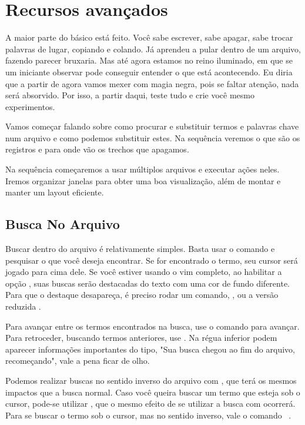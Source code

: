 \chapter{Recursos avançados}
A maior parte do básico está feito.  Você sabe escrever, sabe apagar, sabe
trocar palavras de lugar, copiando e colando.  Já aprendeu a pular dentro
de um arquivo, fazendo parecer bruxaria.  Mas até agora estamos no reino
iluminado, em que se um iniciante observar pode conseguir entender o que
está acontecendo.  Eu diria que a partir de agora vamos mexer com magia
negra, pois se faltar atenção, nada será absorvido.  Por isso, a partir
daqui, teste tudo e crie você mesmo experimentos.

Vamos começar falando sobre como procurar e substituir termos e palavras
chave num arquivo e como podemos substituir estes.  Na sequência veremos o
que são os registros e para onde vão os trechos que apagamos.

Na sequência começaremos a usar múltiplos arquivos e executar ações neles.
Iremos organizar janelas para obter uma boa visualização, além de montar e
manter um layout eficiente.

\section{Busca No Arquivo}
Buscar dentro do arquivo é relativamente simples.
Basta usar o comando \vimcommand{/} e pesquisar o que você deseja encontrar.
Se for encontrado o termo, seu cursor será jogado para cima dele.
Se você estiver usando o vim completo, ao habilitar a opção ,
suas buscas serão destacadas do texto com uma cor de fundo diferente.
Para que o destaque desapareça, é preciso rodar um comando,
, ou a versão reduzida . 

Para avançar entre os termos encontrados na busca, use o comando  para avançar.
Para retroceder, buscando termos anteriores, use .
Na régua inferior podem aparecer informações importantes do tipo, "Sua busca chegou ao fim do arquivo, recomeçando",
vale a pena ficar de olho.


Podemos realizar buscas no sentido inverso do arquivo com , que terá os mesmos impactos que a busca normal.
Caso você queira buscar um termo que esteja sob o cursor, pode-se utilizar \vimcommand{\#},
que o mesmo efeito de se utilizar a busca com \vimcommand{/} ocorrerá. 
Para se buscar o termo sob o cursor, mas no sentido inverso, vale o comando \vimcommand{*}\ .

